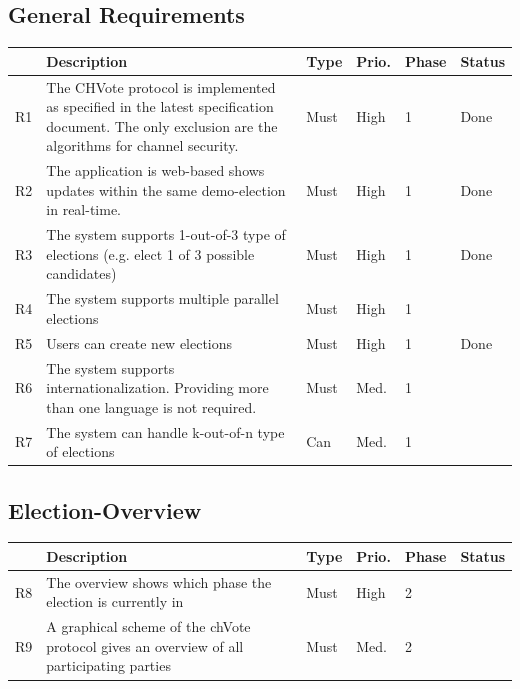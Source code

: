 \subsection{General Requirements}
\begin{longtable}{p{0.5cm}p{9cm}p{1cm}p{1cm}p{1cm}p{1cm}}
\hline
 & Description & Type & Prio. & Phase & Status\\
\hline
R1 & The CHVote protocol is implemented as specified in the latest specification document. The only exclusion are the algorithms for channel security. & Must & High & 1 & Done\\
R2 & The application is web-based shows updates within the same demo-election in real-time. & Must & High & 1 & Done\\
R3 & The system supports 1-out-of-3 type of elections (e.g. elect 1 of 3 possible candidates) & Must & High & 1 & Done\\
R4 & The system supports multiple parallel elections & Must & High & 1 & \\
R5 & Users can create new elections & Must & High & 1 & Done \\
R6 & The system supports internationalization. Providing more than one language is not required. & Must & Med. & 1 & \\
R7 & The system can handle k-out-of-n type of elections & Can & Med. & 1 & \\
\end{longtable}


\subsection{Election-Overview}
\begin{longtable}{p{0.5cm}p{9cm}p{1cm}p{1cm}p{1cm}p{1cm}}
\hline
 & Description & Type & Prio. & Phase & Status\\
\hline
R8 & The overview shows which phase the election is currently in & Must & High & 2 & \\
R9 & A graphical scheme of the chVote protocol gives an overview of all participating parties & Must & Med. & 2 & \\
\end{longtable}

